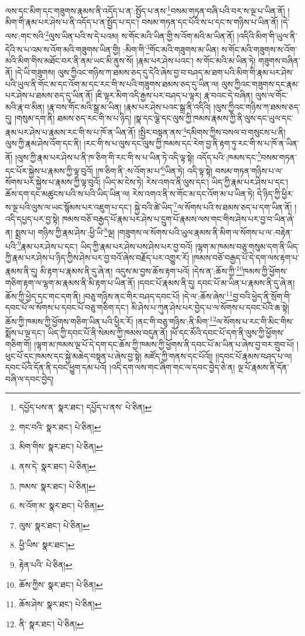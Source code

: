 ལས་དང་མིག་དང་གཟུགས་རྣམས་ནི་འདོད་པ་ན་:སྤྱོད་པ་ནས་\footnote{དཔྱོད་པས་ན་  སྣར་ཐང་། དཔྱོད་པ་ནས་  པེ་ཅིན། }བསམ་གཏན་བཞི་པའི་བར་ས་ལྔ་པ་ཡིན་ནོ། །མིག་གི་རྣམ་པར་ཤེས་པ་ནི་འདོད་པ་ན་སྤྱོད་པ་དང་། བསམ་གཏན་དང་པོའི་ས་པ་དང་ས་གཉིས་པ་ཡིན་ནོ། །དེ་ལས་:གང་སའི་\footnote{གང་བའི་  སྣར་ཐང་།  པེ་ཅིན། }ལུས་ཡིན་པའི་ས་དེ་པའམ། ས་གོང་མའི་ཡིན་གྱི་ས་འོག་མའི་མ་ཡིན་ནོ། །འདིའི་མིག་གི་ཡུལ་ནི་དེའི་ས་པ་འམ་ས་འོག་མའི་གཟུགས་ཡིན་གྱི། :མིག་གི་\footnote{མིག་གིས་  སྣར་ཐང་།  པེ་ཅིན། }གོང་མའི་གཟུགས་མ་ཡིན། ས་གོང་མའི་གཟུགས་ས་འོག་མའི་མིག་གིས་མཐོང་བར་ནི་ནམ་ཡང་མི་ནུས་སོ། །རྣམ་པར་ཤེས་པའང་། ས་གོང་མའི་མ་ཡིན་ཏེ། གཟུགས་བཞིན་ནོ། །དེ་ཡི་གཟུགས། ལུས་ཀྱིའང་གཉིས་ཀ་ཐམས་ཅད་དུ་དེའི་ཞེས་བྱ་བ་བཤད་མ་ཐག་པའི་མིག་གི་རྣམ་པར་ཤེས་པའི་ཡུལ་ནི་གོང་མ་དང་འོག་མ་དང་རང་གི་ས་པའི་གཟུགས་ཐམས་ཅད་དུ་ཡིན་ལ། ལུས་ཀྱིའང་གཟུགས་དང་རྣམ་པར་ཤེས་པ་ཐམས་ཅད་དུ་ཡིན་ནོ། །ཇི་ལྟར་མིག་འདི་རྒྱས་པར་བཤད་པ་ལྟར། རྣ་བའང་དེ་བཞིན། ལུས་ལ་གོང་མའི་རྣ་བ་མིན། །རྣ་བས་གོང་མའི་སྒྲ་མ་ཡིན། །རྣམ་པར་ཤེས་པའང་སྒྲ་ནི་འདིའི། །ལུས་ཀྱིའང་གཉིས་ཀ་ཐམས་ཅད་དུ། །གསུམ་དག་ནི། ཐམས་ཅད་རང་གི་ས་པ་ཉིད། །སྣ་དང་ལྕེ་དང་ལུས་ཀྱི་ཁམས་རྣམས་ཀྱི་ནི་ལུས་དང་ཡུལ་དང་རྣམ་པར་ཤེས་པ་རྣམས་རང་གི་ས་པ་ཁོ་ན་ཡིན་ནོ། །སྤྱིར་བསྟན་ནས་\footnote{ནས་དེ་  སྣར་ཐང་།  པེ་ཅིན། }དམིགས་ཀྱིས་བསལ་བ་གསུངས་པ་ནི། ལུས་ཀྱི་རྣམ་ཤེས་འོག་དང་ནི། །རང་གི་ས་པ་ལུས་དང་ལུས་ཀྱི་ཁམས་དང་རེག་བྱ་ནི་རྟག་ཏུ་རང་གི་ས་པ་ཁོ་ན་ཡིན་ནོ། །ལུས་ཀྱི་རྣམ་པར་ཤེས་པ་ནི་ཁ་ཅིག་གི་རང་གི་ས་པ་ཡིན་ཏེ་འདི་ལྟ་སྟེ། འདོད་པའི་:ཁམས་དང་\footnote{ཁམས་  སྣར་ཐང་།  པེ་ཅིན། }བསམ་གཏན་དང་པོར་སྐྱེས་པ་རྣམས་ཀྱི་ལྟ་བུའོ། །ཁ་ཅིག་ནི་:ས་འོག་མ་པ་\footnote{ས་འོག་མ་  སྣར་ཐང་།  པེ་ཅིན། }ཡིན་ཏེ། འདི་ལྟ་སྟེ། བསམ་གཏན་གཉིས་པ་ལ་སོགས་པར་སྐྱེས་པ་རྣམས་ཀྱི་ལྟ་བུའོ། །ཡིད་མ་ངེས་ཏེ། རེས་འགའ་ནི་ལུས་དང་། ཡིད་ཀྱི་རྣམ་པར་ཤེས་པ་དང་། ཆོས་དག་དང་མཚུངས་པའི་ས་པའི་ཡིད་ཡིན་ལ། རེས་འགའ་ནི་ས་གོང་མ་དང་འོག་མ་པ་ཡིན་ཏེ། དེ་ཉིད་ཀྱི་ཕྱིར་ས་ལྔ་པའི་ལུས་ལ་ཡང་སྙོམས་པར་འཇུག་པ་དང་། སྐྱེ་བའི་ཚེ་ཡིད་\footnote{ལུས་  སྣར་ཐང་།  པེ་ཅིན། }ལ་སོགས་པའི་ས་ཐམས་ཅད་པ་དག་ཡིན་ནོ། །འདི་དཔྱད་པར་བྱ་སྟེ། ཁམས་བཅོ་བརྒྱད་པོ་རྣམ་པར་ཤེས་པ་དྲུག་པོ་རྣམས་ལས་གང་གིས་ཤེས་པར་བྱ་བ་ཡིན་ཞེ་ན། སྨྲས་པ། གཉིས་ཀྱི་རྣམ་ཤེས་:ཕྱི་ཡི་\footnote{ཕྱི་ཡིས་  སྣར་ཐང་། }ལྔ། །གཟུགས་ལ་སོགས་པའི་ཡུལ་རྣམས་ནི་མིག་ལ་སོགས་པ་ལ་:བརྟེན་པའི་\footnote{རྟེན་པའི་  པེ་ཅིན། }རྣམ་པར་ཤེས་པ་དང་། ཡིད་ཀྱི་རྣམ་པར་ཤེས་པས་ཤེས་པར་བྱ་བའོ། །ལྷག་མ་ཁམས་བཅུ་གསུམ་དག་ནི་ཡིད་ཀྱི་རྣམ་པར་ཤེས་པ་ཉིད་ཀྱིས་ཤེས་པར་བྱ་བའོ་ཞེས་བརྗོད་པར་འགྱུར་རོ། །ཁམས་བཅོ་བརྒྱད་པོ་དེ་དག་ལས་རྟག་པ་རྣམས་ནི་དུ། མི་རྟག་པ་རྣམས་ནི་དུ་ཞེ་ན། འདུས་མ་བྱས་ཆོས་རྟག་པའོ། །དེས་ན་:ཆོས་ཀྱི་\footnote{ཆོས་ཀྱིས་  སྣར་ཐང་།  པེ་ཅིན། }ཁམས་ཀྱི་ཕྱོགས་གཅིག་རྟག་ལ་ལྷག་མ་རྣམས་ནི་མི་རྟག་པ་ཡིན་ནོ། །དབང་པོ་རྣམས་ནི་དུ། དབང་པོ་མ་ཡིན་པ་རྣམས་ནི་དུ་ཞེ་ན། ཆོས་ཀྱི་ཕྱེད་དང་གང་དག་ནི། །བཅུ་གཉིས་ནང་གིར་བཤད་དབང་པོ། །དེ་ལ་:ཆོས་ཞེས་\footnote{ཆོས་ཤེས་  སྣར་ཐང་།  པེ་ཅིན། }བྱ་བའི་ཕྱེད་ནི་སྲོག་གི་དབང་པོ་ལ་སོགས་པ་དབང་པོ་བཅུ་གཅིག་དང་། མི་ཤེས་པ་ཀུན་ཤེས་པར་བྱེད་པ་ལ་སོགས་པ་དབང་པོའི་ཆ་སྟེ། ཆོས་ཀྱི་ཁམས་ཀྱི་ཕྱོགས་གཅིག་ཡིན་པའི་ཕྱིར་རོ། །ནང་གི་བཅུ་གཉིས་:ནི་མིག་\footnote{ནི་  སྣར་ཐང་།  པེ་ཅིན། }ལ་སོགས་པ་རང་གི་མིང་གིས་སྨོས་པ་ལྔ་དང་། ཡིད་ཀྱི་དབང་པོ་ནི་སེམས་ཀྱི་ཁམས་བདུན་ནོ། །ཕོ་དང་མོའི་དབང་པོ་དག་ནི་ལུས་ཀྱི་ཕྱོགས་གཅིག་གོ། །ལྷག་མ་ཁམས་ལྔ་པོ་དེ་དག་དང་ཆོས་ཀྱི་ཁམས་ཀྱི་ཕྱོགས་ནི་དབང་པོ་མ་ཡིན་པ་ཞེས་བྱ་བར་གྲུབ་པོ། །ཕུང་པོ་དང་ཁམས་དང་སྐྱེ་མཆེད་བསྟན་པ་ཞེས་བྱ་སྟེ། མཛོད་ཀྱི་གནས་དང་པོའོ།། །།དབང་པོ་རྣམས་བཤད་པ་ལ། དབང་པོའི་དོན་ནི་དབང་ཕྱུག་དམ་པའོ། །འདི་དག་ལས་གང་ཞིག་གང་ལ་དབང་བྱེད་ཅེ་ན། ལྔ་པོ་རྣམས་ནི་དོན་བཞི་ལ་དབང་བྱེད། 
